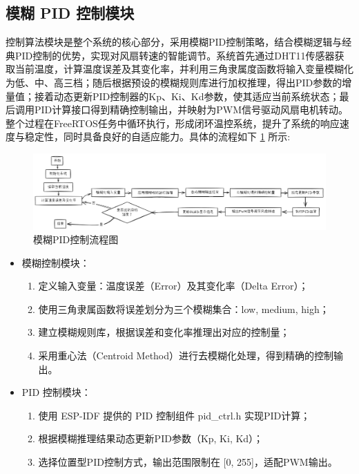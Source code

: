 \documentclass[UTF8]{ctexart}
\begin{document}
\subsection{模糊 PID 控制模块}
控制算法模块是整个系统的核心部分，采用模糊PID控制策略，结合模糊逻辑与经典PID控制的优势，实现对风扇转速的智能调节。系统首先通过DHT11传感器获取当前温度，计算温度误差及其变化率，并利用三角隶属度函数将输入变量模糊化为低、中、高三档；随后根据预设的模糊规则库进行加权推理，得出PID参数的增量值；接着动态更新PID控制器的Kp、Ki、Kd参数，使其适应当前系统状态；最后调用PID计算接口得到精确控制输出，并映射为PWM信号驱动风扇电机转动。整个过程在FreeRTOS任务中循环执行，形成闭环温控系统，提升了系统的响应速度与稳定性，同时具备良好的自适应能力。具体的流程如下 \ref{fig:mermaid} 所示:
\begin{figure}[htbp]
	\centering
	\includegraphics[width=1\linewidth]{figure/mermaid}
	\caption{模糊PID控制流程图}
	\label{fig:mermaid}
\end{figure}
\par 
\begin{itemize}
	\item 模糊控制模块：
	\begin{enumerate}
		\item 定义输入变量：温度误差（Error）及其变化率（Delta Error）；
		\item 使用三角隶属函数将误差划分为三个模糊集合：low, medium, high；
		\item 建立模糊规则库，根据误差和变化率推理出对应的控制量；
		\item 采用重心法（Centroid Method）进行去模糊化处理，得到精确的控制输出。
	\end{enumerate}
	\item PID 控制模块：
	\begin{enumerate}
		\item 使用 ESP-IDF 提供的 PID 控制组件 pid\_ctrl.h 实现PID计算；
		\item 根据模糊推理结果动态更新PID参数（Kp, Ki, Kd）；
		\item 选择位置型PID控制方式，输出范围限制在 [0, 255]，适配PWM输出。
	\end{enumerate}
\end{itemize}
\end{document}
